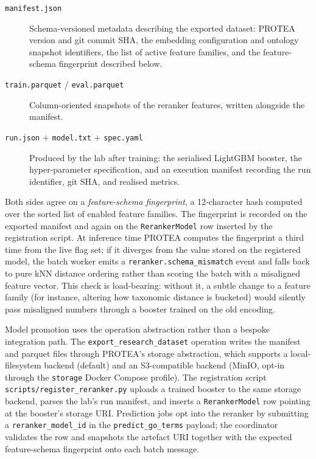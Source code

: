 \begin{description}
  \item[\texttt{manifest.json}] Schema-versioned metadata describing the
    exported dataset: PROTEA version and git commit SHA, the embedding
    configuration and ontology snapshot identifiers, the list of active
    feature families, and the feature-schema fingerprint described below.
  \item[\texttt{train.parquet} / \texttt{eval.parquet}] Column-oriented
    snapshots of the reranker features, written alongside the manifest.
  \item[\texttt{run.json} + \texttt{model.txt} + \texttt{spec.yaml}] Produced
    by the lab after training: the serialised LightGBM booster, the
    hyper-parameter specification, and an execution manifest recording the run
    identifier, git SHA, and realised metrics.
\end{description}

Both sides agree on a \emph{feature-schema fingerprint}, a 12-character hash
computed over the sorted list of enabled feature families. The fingerprint is
recorded on the exported manifest and again on the \texttt{RerankerModel} row
inserted by the registration script. At inference time PROTEA computes the
fingerprint a third time from the live flag set; if it diverges from the value
stored on the registered model, the batch worker emits a
\texttt{reranker.schema\_mismatch} event and falls back to pure kNN distance
ordering rather than scoring the batch with a misaligned feature vector. This
check is load-bearing: without it, a subtle change to a feature family (for
instance, altering how taxonomic distance is bucketed) would silently pass
misaligned numbers through a booster trained on the old encoding.

Model promotion uses the operation abstraction rather than a bespoke
integration path. The \texttt{export\_research\_dataset} operation writes the
manifest and parquet files through PROTEA's storage abstraction, which
supports a local-filesystem backend (default) and an S3-compatible backend
(MinIO, opt-in through the \texttt{storage} Docker Compose profile). The
registration script \texttt{scripts/register\_reranker.py} uploads a trained
booster to the same storage backend, parses the lab's run manifest, and
inserts a \texttt{RerankerModel} row pointing at the booster's storage URI.
Prediction jobs opt into the reranker by submitting a \texttt{reranker\_model\_id}
in the \texttt{predict\_go\_terms} payload; the coordinator validates the row
and snapshots the artefact URI together with the expected feature-schema
fingerprint onto each batch message.

